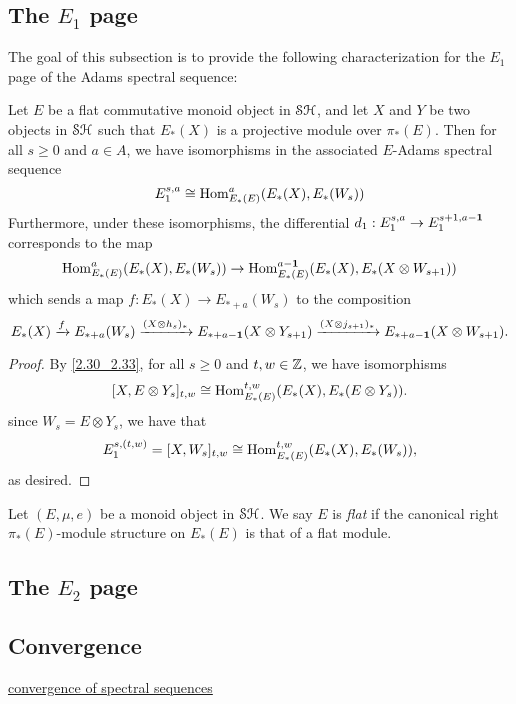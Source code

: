 \documentclass[../main.tex]{subfiles}
\begin{document}
\subsection{The \texorpdfstring{$E_1$}{TEXT} page}

The goal of this subsection is to provide the following characterization for the $E_1$ page of the Adams spectral sequence:

\begin{theorem}
	Let $E$ be a flat commutative monoid object in $\mathcal{SH}$, and let $X$ and $Y$ be two objects in $\mathcal{SH}$ such that $E_\ast(X)$ is a projective module over $\pi_\ast(E)$. Then for all $s\geq0$ and $a\in A$, we have isomorphisms in the associated $E$-Adams spectral sequence
	\[E_1^{s,a}\cong\mathrm{Hom}_{E_\ast(E)}^{a}(E_\ast(X),E_\ast(W_s))\]
	Furthermore, under these isomorphisms, the differential $d_1:E_1^{s,a}\to E_1^{s+1,a-\mathbf{1}}$ corresponds to the map
	\[\mathrm{Hom}_{E_\ast(E)}^{a}(E_\ast(X),E_\ast(W_s))\to\mathrm{Hom}_{E_\ast(E)}^{a-\mathbf{1}}(E_\ast(X),E_\ast(X\otimes W_{s+1}))\]
	which sends a map $f:E_\ast(X)\to E_{\ast+a}(W_s)$ to the composition 
	\[E_\ast(X)\xrightarrow f E_{\ast+a}(W_s)\xrightarrow{(X\otimes h_s)_\ast}E_{\ast+a-\mathbf{1}}(X\otimes Y_{s+1})\xrightarrow{(X\otimes j_{s+1})_\ast}E_{\ast+a-\mathbf{1}}(X\otimes W_{s+1}).\]
\end{theorem}
\begin{proof}
	By \autoref{2.30_2.33}, for all $s\geq0$ and $t,w\in\mathbb{Z}$, we have isomorphisms
	\[[X,E\otimes Y_s]_{t,w}\cong\mathrm{Hom}_{E_\ast(E)}^{t,w}(E_\ast(X),E_\ast(E\otimes Y_s)).\]
	since $W_s=E\otimes Y_s$, we have that
	\[E_1^{s,(t,w)}=[X,W_s]_{t,w}\cong\mathrm{Hom}_{E_\ast(E)}^{t,w}(E_\ast(X),E_\ast(W_s)),\]
	as desired. 
\end{proof}

\begin{definition}
	Let $(E,\mu,e)$ be a monoid object in $\mathcal{SH}$. We say $E$ is \emph{flat} if the canonical right $\pi_\ast(E)$-module structure on $E_\ast(E)$ is that of a flat module.
\end{definition}

\subsection{The \texorpdfstring{$E_2$}{TEXT} page}

\subsection{Convergence}

\href{https://www.uio.no/studier/emner/matnat/math/MAT9580/v12/undervisningsmateriale/boardman-conditionally-1999.pdf}{convergence of spectral sequences}
\end{document}
